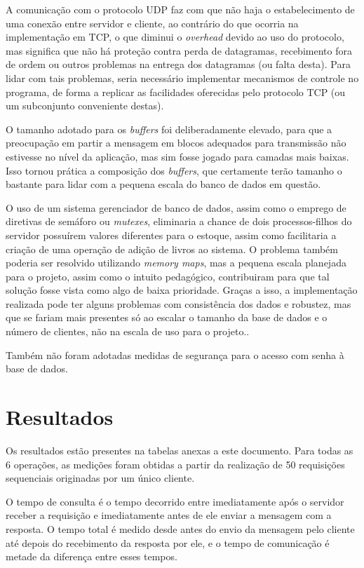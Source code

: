 \documentclass[11pt, brazil]{article} %
\begin{document}
A comunicação com o protocolo UDP faz com que não haja o estabelecimento de uma conexão entre servidor e cliente, ao contrário do que ocorria na implementação em TCP, o que diminui o \emph{overhead} devido ao uso do protocolo, mas significa que não há proteção contra perda de datagramas, recebimento fora de ordem ou outros problemas na entrega dos datagramas (ou falta desta). Para lidar com tais problemas, seria necessário implementar mecanismos de controle no programa, de forma a replicar as facilidades oferecidas pelo protocolo TCP (ou um subconjunto conveniente destas).

O tamanho adotado para os \emph{buffers} foi deliberadamente elevado, para que a preocupação em partir a mensagem em blocos adequados para transmissão não estivesse no nível da aplicação, mas sim fosse jogado para camadas mais baixas. Isso tornou prática a composição dos \emph{buffers}, que certamente terão tamanho o bastante para lidar com a pequena escala do banco de dados em questão.

O uso de um sistema gerenciador de banco de dados, assim como o emprego de diretivas de semáforo ou \emph{mutexes}, eliminaria a chance de dois processos-filhos do servidor possuírem valores diferentes para o estoque, assim como facilitaria a criação de uma operação de adição de livros ao sistema. 
O problema também poderia ser resolvido utilizando \emph{memory maps}, mas a pequena escala planejada para o projeto, assim como o intuito pedagógico, contribuiram para que tal solução fosse vista como algo de baixa prioridade.
Graças a isso, a implementação realizada pode ter alguns problemas com consistência dos dados e robustez, mas que se fariam mais presentes só ao escalar o tamanho da base de dados e o número de clientes, não na escala de uso para o projeto.. 

Também não foram adotadas medidas de segurança para o acesso com senha à base de dados.

\section{Resultados}

Os resultados estão presentes na tabelas anexas a este documento. Para todas as 6 operações,
as medições foram obtidas a partir da realização de 50 requisições sequenciais originadas
por um único cliente.

O tempo de consulta é o tempo decorrido entre imediatamente após o servidor receber a requisição e imediatamente antes de ele enviar a mensagem com a resposta. O tempo total é medido desde antes do envio da mensagem pelo cliente até depois do recebimento da resposta por ele, e o tempo de comunicação é metade da diferença entre esses tempos.
\end{document}
